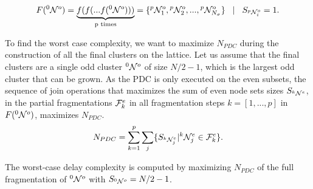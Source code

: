 \begin{equation}\label{eq:fullfrag}
    F({}^{0}\mathcal{N}^o) = \underbrace{f(f(...f({}^{0}\mathcal{N}^o)))}_\text{p times} = \{{}^{p}\mathcal{N}^{o}_1, {}^{p}\mathcal{N}^{o}_2,...,{}^{p}\mathcal{N}^{o}_{N_\sigma} \} \hspace{.3cm} | \hspace{.3cm} S_{{}^{p}\mathcal{N}^{o}_i} = 1.
  \end{equation}

To find the worst case complexity, we want to maximize $N_{PDC}$ during the construction of all the final clusters on the lattice. Let us assume that the final clusters are a single odd cluster ${}^{0}\mathcal{N}^o$ of size $N/2-1$, which is the largest odd cluster that can be grown. As the PDC is only executed on the even subsets, the sequence of join operations that maximizes the sum of even node sets sizes $S_{{}^{k}\mathcal{N}^e}$, in the partial fragmentations $\mathcal{F}^e_{k}$ in all fragmentation steps $k=[1,...,p]$ in $F({}^{0}\mathcal{N}^o)$, maximizes $N_{PDC}$.
\begin{equation}\label{eq:maxdelay}
  N_{PDC} = \sum_{k=1}^{p} \sum_j \{ S_{{}^{k}\mathcal{N}_j^e} | {}^{k}\mathcal{N}_j^e \in \mathcal{F}^e_k \}.
\end{equation}

\begin{proposition}
  The worst-case delay complexity is computed by maximizing $N_{PDC}$ of the full fragmentation of ${}^{0}\mathcal{N}^o$ with $S_{{}^{0}\mathcal{N}^o} = N/2-1$.
\end{proposition}

